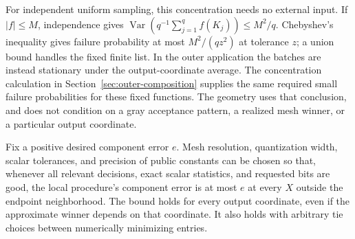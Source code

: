 For independent uniform sampling, this concentration needs no external
input. If $|f|\le M$, independence gives
$\operatorname{Var}(q^{-1}\sum_{j=1}^q f(K_j))\le M^2/q$.
Chebyshev's inequality gives failure probability at most
$M^2/(qz^2)$ at tolerance $z$; a union bound handles the fixed finite
list. In the outer application the batches are instead stationary
under the output-coordinate average. The concentration calculation in
Section~\ref{sec:outer-composition} supplies the same required small
failure probabilities for these fixed functions. The geometry uses
that conclusion, and does not condition on a gray acceptance pattern,
a realized mesh winner, or a particular output coordinate.

\begin{lemma}\label{geo:stability}
Fix a positive desired component error $e$. Mesh resolution,
quantization width, scalar tolerances, and precision of public constants
can be chosen so that, whenever all relevant decisions, exact scalar
statistics, and requested bits are good, the local procedure's component
error is at most $e$ at every $X$ outside the endpoint neighborhood.
The bound holds for every output coordinate, even if the approximate
winner depends on that coordinate. It also holds with arbitrary tie
choices between numerically minimizing entries.
\end{lemma}
